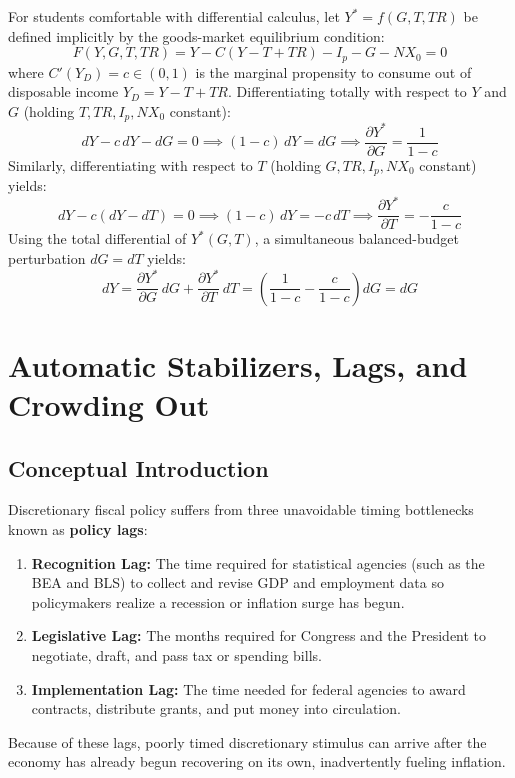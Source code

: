 \documentclass[11pt,letterpaper]{article}
\begin{document}
\begin{takeaways}
For students comfortable with differential calculus, let $Y^* = f(G, T, TR)$ be defined implicitly by the goods-market equilibrium condition:
\[
F(Y, G, T, TR) = Y - C(Y - T + TR) - I_p - G - NX_0 = 0
\]
where $C'(Y_D) = c \in (0,1)$ is the marginal propensity to consume out of disposable income $Y_D = Y - T + TR$. Differentiating totally with respect to $Y$ and $G$ (holding $T, TR, I_p, NX_0$ constant):
\[
dY - c\,dY - dG = 0 \implies (1 - c)\,dY = dG \implies \frac{\partial Y^*}{\partial G} = \frac{1}{1 - c}
\]
Similarly, differentiating with respect to $T$ (holding $G, TR, I_p, NX_0$ constant) yields:
\[
dY - c(dY - dT) = 0 \implies (1 - c)\,dY = -c\,dT \implies \frac{\partial Y^*}{\partial T} = -\frac{c}{1 - c}
\]
Using the total differential of $Y^*(G, T)$, a simultaneous balanced-budget perturbation $dG = dT$ yields:
\[
dY = \frac{\partial Y^*}{\partial G}\,dG + \frac{\partial Y^*}{\partial T}\,dT = \left(\frac{1}{1-c} - \frac{c}{1-c}\right)dG = dG
\]
\end{takeaways}

\section{Automatic Stabilizers, Lags, and Crowding Out}

\subsection*{Conceptual Introduction}
Discretionary fiscal policy suffers from three unavoidable timing bottlenecks known as \textbf{policy lags}:
\begin{enumerate}
    \item \textbf{Recognition Lag:} The time required for statistical agencies (such as the BEA and BLS) to collect and revise GDP and employment data so policymakers realize a recession or inflation surge has begun.
    \item \textbf{Legislative Lag:} The months required for Congress and the President to negotiate, draft, and pass tax or spending bills.
    \item \textbf{Implementation Lag:} The time needed for federal agencies to award contracts, distribute grants, and put money into circulation.
\end{enumerate}
Because of these lags, poorly timed discretionary stimulus can arrive after the economy has already begun recovering on its own, inadvertently fueling inflation.
\end{document}
